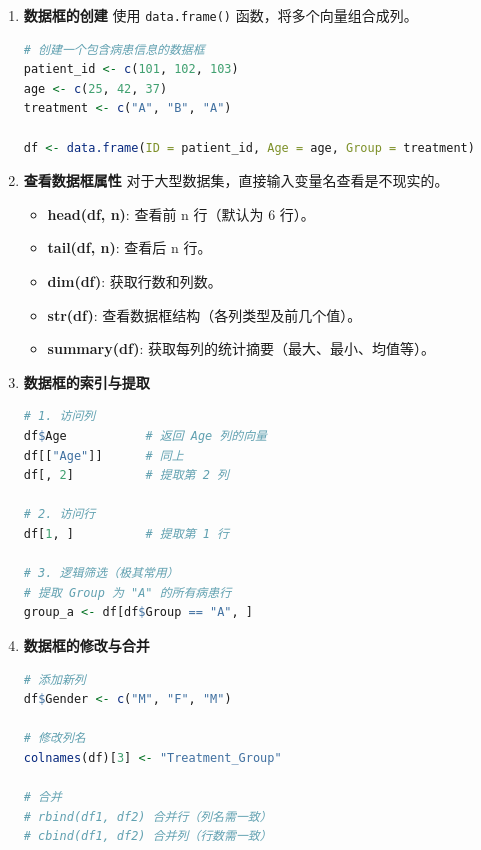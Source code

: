 \begin{enumerate}[label=\arabic*., leftmargin=2em]
    \item \textbf{数据框的创建}
    使用 \texttt{data.frame()} 函数，将多个向量组合成列。
\begin{lstlisting}[language=R]
# 创建一个包含病患信息的数据框
patient_id <- c(101, 102, 103)
age <- c(25, 42, 37)
treatment <- c("A", "B", "A")

df <- data.frame(ID = patient_id, Age = age, Group = treatment)
\end{lstlisting}

    \item \textbf{查看数据框属性}
    对于大型数据集，直接输入变量名查看是不现实的。
    \begin{itemize}
        \item \textbf{head(df, n)}: 查看前 n 行（默认为 6 行）。
        \item \textbf{tail(df, n)}: 查看后 n 行。
        \item \textbf{dim(df)}: 获取行数和列数。
        \item \textbf{str(df)}: 查看数据框结构（各列类型及前几个值）。
        \item \textbf{summary(df)}: 获取每列的统计摘要（最大、最小、均值等）。
    \end{itemize}

    \item \textbf{数据框的索引与提取}
\begin{lstlisting}[language=R]
# 1. 访问列
df$Age           # 返回 Age 列的向量
df[["Age"]]      # 同上
df[, 2]          # 提取第 2 列

# 2. 访问行
df[1, ]          # 提取第 1 行

# 3. 逻辑筛选（极其常用）
# 提取 Group 为 "A" 的所有病患行
group_a <- df[df$Group == "A", ]
\end{lstlisting}

    \item \textbf{数据框的修改与合并}
\begin{lstlisting}[language=R]
# 添加新列
df$Gender <- c("M", "F", "M")

# 修改列名
colnames(df)[3] <- "Treatment_Group"

# 合并
# rbind(df1, df2) 合并行（列名需一致）
# cbind(df1, df2) 合并列（行数需一致）
\end{lstlisting}
\end{enumerate}



